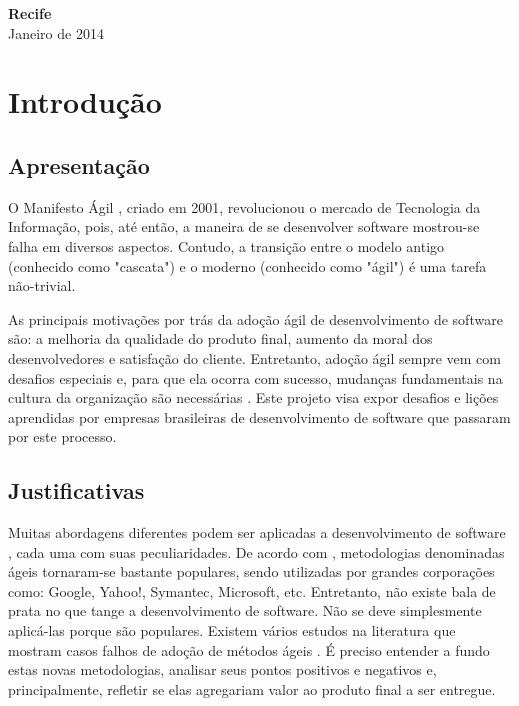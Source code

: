 \documentclass[a4paper,11pt]{article}
\begin{document}
\vspace{3.0cm}
\begin{center}
{\large {\bf Recife}\\[6mm]
Janeiro de 2014}
\end{center}
\newpage

\newpage
\pagestyle {plain}
\setcounter{page}{0} 

\section{Introdução}
\subsection{Apresentação}
O Manifesto Ágil \cite{agileManifesto}, criado em 2001, revolucionou o mercado de Tecnologia da Informação, pois, até então, a maneira de se desenvolver software mostrou-se falha em diversos aspectos. Contudo, a transição entre o modelo antigo (conhecido como "cascata") e o moderno (conhecido como "ágil") é uma tarefa não-trivial.

As principais motivações por trás da adoção ágil de desenvolvimento de software são: a melhoria da qualidade do produto final, aumento da moral dos desenvolvedores e satisfação do cliente. Entretanto, adoção ágil sempre vem com desafios especiais e, para que ela ocorra com sucesso, mudanças fundamentais na cultura da organização são necessárias \cite{Hassan2011}. Este projeto visa expor desafios e lições aprendidas por empresas brasileiras de desenvolvimento de software que passaram por este processo.
\subsection{Justificativas}
Muitas abordagens diferentes podem ser aplicadas a desenvolvimento de software \cite{Kettunen2010}, cada uma com suas peculiaridades. De acordo com \cite{Shore2007}, metodologias denominadas ágeis tornaram-se bastante populares, sendo utilizadas por grandes corporações como: Google, Yahoo!, Symantec, Microsoft, etc. Entretanto, não existe bala de prata no que tange a desenvolvimento de software. Não se deve simplesmente aplicá-las porque são populares. Existem vários estudos na literatura que mostram casos falhos de adoção de métodos ágeis \cite{Krasteva2008}. É preciso entender a fundo estas novas metodologias, analisar seus pontos positivos e negativos e, principalmente, refletir se elas agregariam valor ao produto final a ser entregue.
\end{document}
